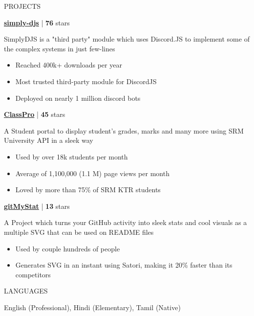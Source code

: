 \documentclass{resume}
\begin{document}
\begin{rSection}{PROJECTS}    
    \item \textbf{\href{https://github.com/Rahuletto/simply-djs}{simply-djs}} | \textbf{76} stars

SimplyDJS is a "third party" module which uses Discord.JS to implement some of the complex
systems in just few-lines

\begin{itemize}
\item Reached 400k+ downloads per year
\item Most trusted third-party module for DiscordJS
\item Deployed on nearly 1 million discord bots
\end{itemize}
\item \textbf{\href{https://github.com/Rahuletto/ClassPro}{ClassPro}} | \textbf{45} stars

A Student portal to display student's grades, marks and many more using SRM University API in a sleek way

\begin{itemize}
\item Used by over 18k students per month
\item Average of 1,100,000 (1.1 M) page views per month
\item Loved by more than 75\% of SRM KTR students
\end{itemize}
\item \textbf{\href{https://github.com/Rahuletto/gitMyStat}{gitMyStat}} | \textbf{13} stars

A Project which turns your GitHub activity into sleek stats and cool visuals as a multiple SVG that can be used on README files

\begin{itemize}
\item Used by couple hundreds of people
\item Generates SVG in an instant using Satori, making it 20\% faster than its competitors
\end{itemize}

\end{rSection}
\vspace{1.5em}


\begin{rSection}{LANGUAGES}

\begin{itemize}
    English (Professional), Hindi (Elementary), Tamil (Native)
\end{itemize}

\end{rSection}
\end{document}
